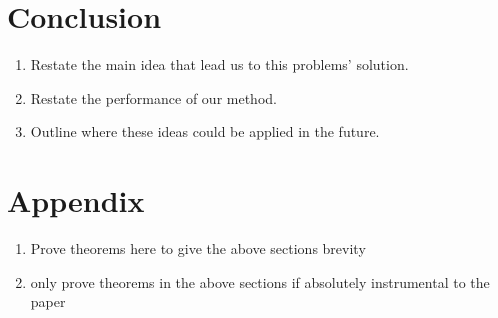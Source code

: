 \documentclass[11pt]{article}
\begin{document}
\section{Conclusion}
\begin{enumerate}
	\item Restate the main idea that lead us to this problems' solution.
	\item Restate the performance of our method.
	\item Outline where these ideas could be applied in the future.
\end{enumerate}




\section{Appendix}
\begin{enumerate}
	\item Prove theorems here to give the above sections brevity
	\item only prove theorems in the above sections if absolutely instrumental
	      to the paper
\end{enumerate}
\end{document}

